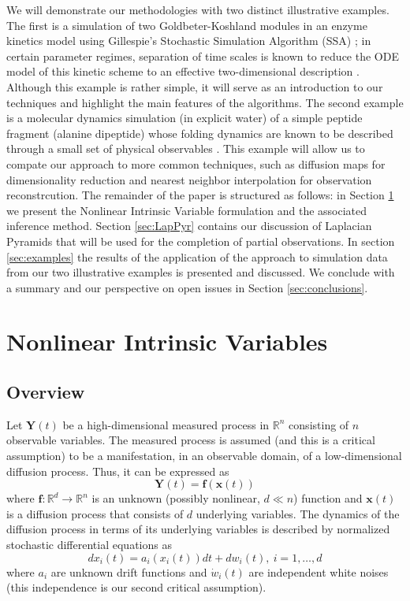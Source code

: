 \documentclass[aip,jcp,preprint]{revtex4-1}
\begin{document}
We will demonstrate our methodologies with two distinct illustrative examples.
%
The first is a simulation
of two Goldbeter-Koshland modules in an enzyme kinetics model using Gillespie's Stochastic Simulation
Algorithm (SSA) \cite{gillespie1977exact};
in certain parameter regimes, separation of time scales is known
to reduce the ODE model of this kinetic scheme to an effective two-dimensional description \cite{zagaris2012stability}.
%
Although this example is rather simple, it will serve as an introduction to our techniques and highlight the main features of the algorithms.
%
The second example is a molecular dynamics
simulation (in explicit water) of a simple peptide fragment (alanine dipeptide) whose folding
dynamics are known to be described through a small set of physical observables \cite{bolhuis2000reaction}.
%
This example will allow us to compate our approach to more common techniques,
such as diffusion maps for dimensionality reduction
and nearest neighbor interpolation for observation reconstrcution.
%
The remainder of the paper is structured as follows: in Section \ref{sec:NIV} we present the Nonlinear Intrinsic Variable formulation and
the associated inference method.
%
Section \ref{sec:LapPyr} contains our discussion of Laplacian Pyramids that
will be used for the completion of partial observations.
%
In section \ref{sec:examples} the results
of the application of the approach to simulation data from our two illustrative examples is presented and discussed.
%
We conclude with a summary and our perspective on open issues in Section \ref{sec:conclusions}.

\section{Nonlinear Intrinsic Variables} \label{sec:NIV}

\subsection{Overview}
Let $\mathbf{Y}(t)$ be a high-dimensional measured process in $\mathbb{R}^n$ consisting of $n$ observable variables.
%
The measured process is assumed (and this is a critical assumption) to be a manifestation, in an observable domain, of a low-dimensional diffusion process. Thus, it can be expressed as
\begin{equation}
	\mathbf{Y}(t) = \mathbf{f}(\mathbf{x}(t))
\end{equation}
where $\mathbf{f}:\mathbb{R}^d \rightarrow \mathbb{R}^n$ is an unknown (possibly nonlinear, $d \ll n$) function and $\mathbf{x}(t)$ is a diffusion process that consists of $d$ underlying variables.
%
The dynamics of the diffusion process in terms of its underlying variables is described by normalized stochastic differential equations as
\begin{equation}
	d x_i(t) = a_i (x_i(t)) dt + d w_i(t), \ i=1,\ldots,d
\end{equation}
where $a_i$ are unknown drift functions and $\dot{w}_i(t)$ are independent white noises (this independence is our second critical assumption).
\end{document}
